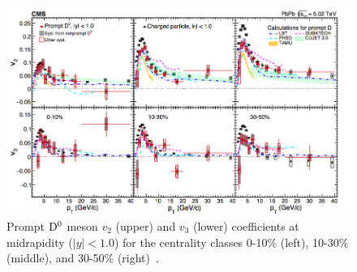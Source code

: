 \begin{figure}[!ht]
  \centering
        \includegraphics[width=14cm]{FigCap2/D0v2_CMS_5TeV.png}
  \caption{Prompt ${\rm D^0}$ meson $v_2$ (upper) and $v_3$ (lower) coefficients at midrapidity ($|y| < 1.0$) for
the centrality classes 0-10\% (left), 10-30\% (middle), and 30-50\% (right)~\cite{Sirunyan:2017plt}.}
  \label{fig:D0v2CMS}
\end{figure}

